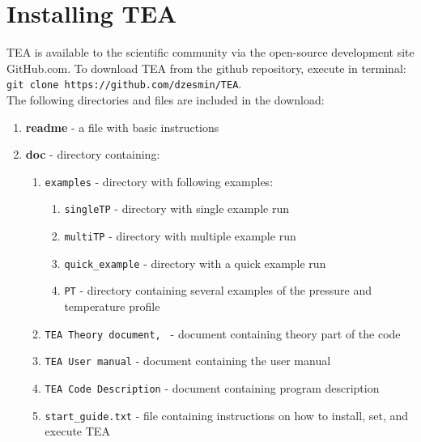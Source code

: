 
\section{Installing TEA}
\label{InstallTEA}
TEA is available to the scientific community via the open-source
development site GitHub.com. To download TEA from the github
repository, execute in terminal: \\ \texttt{git clone
https://github.com/dzesmin/TEA}.\\

The following directories and files are included in the download:
{
\begin{enumerate}
\setlength\itemsep{0ex}
\setlength\topsep{0ex}
\setlength\partopsep{0ex}
\setlength\parsep{0ex}

\item {\bf readme} - a file with basic instructions

\item {\bf doc } - directory containing: 

\begin{enumerate}
\setlength\itemsep{0ex}
\setlength\topsep{0ex}
\setlength\partopsep{0ex}
\setlength\parsep{0ex}
\item \texttt{examples} - directory with following examples:
\begin{enumerate}
\setlength\itemsep{0ex}
\setlength\topsep{0ex}
\setlength\partopsep{0ex}
\setlength\parsep{0ex}
\item \texttt{singleTP} - directory with single  example run
\item \texttt{multiTP} - directory with multiple  example run
\item \texttt{quick\_example} - directory with a quick example run
\item \texttt{PT} - directory containing several examples of the
  pressure and temperature profile
\end{enumerate}
\item \texttt{TEA Theory document, \citet{BlecicEtal2016-TEAtheory}} - 
document containing \newline theory part of the code
\item \texttt{TEA User manual} - document containing the user manual
\item \texttt{TEA Code Description} - document containing program
  description
\item \texttt{start\_guide.txt} - file containing instructions on how to
  install, set, and execute TEA
\end{enumerate}


\end{enumerate}}

